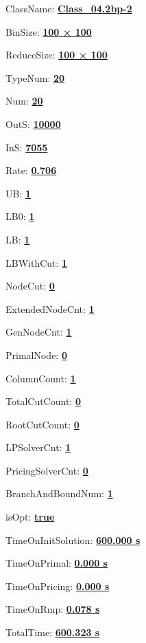 \documentclass[11pt]{article}
\begin{document}
\pagestyle{empty}


ClassName: \underline{\textbf{Class_04.2bp-2}}
\par
BinSize: \underline{\textbf{100 × 100}}
\par
ReduceSize: \underline{\textbf{100 × 100}}
\par
TypeNum: \underline{\textbf{20}}
\par
Num: \underline{\textbf{20}}
\par
OutS: \underline{\textbf{10000}}
\par
InS: \underline{\textbf{7055}}
\par
Rate: \underline{\textbf{0.706}}
\par
UB: \underline{\textbf{1}}
\par
LB0: \underline{\textbf{1}}
\par
LB: \underline{\textbf{1}}
\par
LBWithCut: \underline{\textbf{1}}
\par
NodeCut: \underline{\textbf{0}}
\par
ExtendedNodeCnt: \underline{\textbf{1}}
\par
GenNodeCnt: \underline{\textbf{1}}
\par
PrimalNode: \underline{\textbf{0}}
\par
ColumnCount: \underline{\textbf{1}}
\par
TotalCutCount: \underline{\textbf{0}}
\par
RootCutCount: \underline{\textbf{0}}
\par
LPSolverCnt: \underline{\textbf{1}}
\par
PricingSolverCnt: \underline{\textbf{0}}
\par
BranchAndBoundNum: \underline{\textbf{1}}
\par
isOpt: \underline{\textbf{true}}
\par
TimeOnInitSolution: \underline{\textbf{600.000 s}}
\par
TimeOnPrimal: \underline{\textbf{0.000 s}}
\par
TimeOnPricing: \underline{\textbf{0.000 s}}
\par
TimeOnRmp: \underline{\textbf{0.078 s}}
\par
TotalTime: \underline{\textbf{600.323 s}}
\par
\newpage
\end{document}
